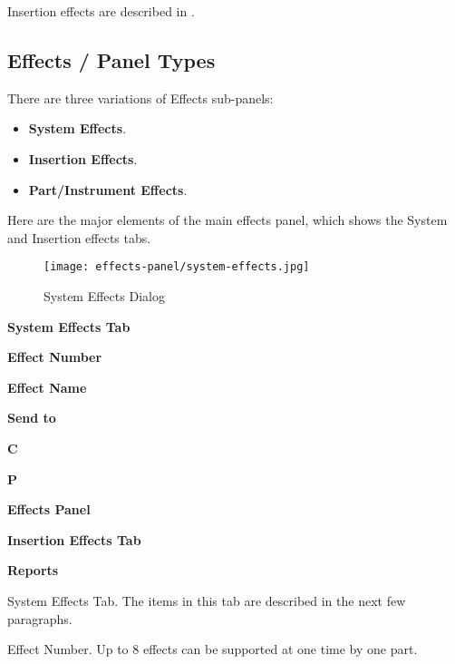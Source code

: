    Insertion effects are described in
   .

\subsection{Effects / Panel Types}
\label{subsec:effects_paneltypes}

   There are three variations of Effects sub-panels:

   \begin{itemize}
      \item \textbf{System Effects}.
      \item \textbf{Insertion Effects}.
      \item \textbf{Part/Instrument Effects}.
   \end{itemize}

   Here are the major elements of the main effects panel, which shows the
   System and Insertion effects tabs.

\begin{figure}[H]
   \centering 
   \texttt{[image: effects-panel/system-effects.jpg]}
   \caption{System Effects Dialog}
   \label{fig:system_effects_dialog}
\end{figure}

   \begin{enumber}
      \item \textbf{System Effects Tab}
      \item \textbf{Effect Number}
      \item \textbf{Effect Name}
      \item \textbf{Send to}
      \item \textbf{C}
      \item \textbf{P}
      \item \textbf{Effects Panel}
      \item \textbf{Insertion Effects Tab}
      \item \textbf{Reports}
   \end{enumber}

   \setcounter{ItemCounter}{0}      %

   System Effects Tab.
   The items in this tab are described in the next few paragraphs.

   Effect Number.
   Up to 8 effects can be supported at one time by one part.

